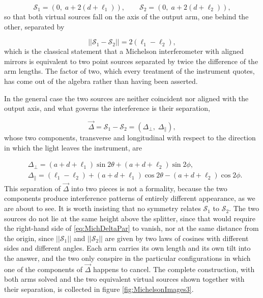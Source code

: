         \begin{equation}\label{eq:MichAligned}
            \mathcal{S}_1 = \left(0,\;a+2\left(d+\ell_1\right)\right), \qquad \mathcal{S}_2 = \left(0,\;a+2\left(d+\ell_2\right)\right),
        \end{equation}
        so that both virtual sources fall on the axis of the output arm, one behind the other, separated by

        \begin{equation*}
            \left|\left|\mathcal{S}_1-\mathcal{S}_2\right|\right| = 2\left(\ell_1-\ell_2\right),
        \end{equation*}
        which is the classical statement that a Michelson interferometer with aligned mirrors is equivalent to two point sources separated by twice the difference of the arm lengths. The factor of two, which every treatment of the instrument quotes, has come out of the algebra rather than having been asserted.

        In the general case the two sources are neither coincident nor aligned with the output axis, and what governs the interference is their separation,

        \begin{equation}\label{eq:MichDelta}
            \vec{\Delta} = \mathcal{S}_1 - \mathcal{S}_2 = \left(\Delta_\perp,\;\Delta_\parallel\right),
        \end{equation}
        whose two components, transverse and longitudinal with respect to the direction in which the light leaves the instrument, are

        \begin{align}
            & \Delta_\perp = \left(a+d+\ell_1\right)\sin 2\theta + \left(a+d+\ell_2\right)\sin 2\phi,\label{eq:MichDeltaPerp}\\
            & \Delta_\parallel = \left(\ell_1-\ell_2\right) + \left(a+d+\ell_1\right)\cos 2\theta - \left(a+d+\ell_2\right)\cos 2\phi.\label{eq:MichDeltaPar}
        \end{align}
        This separation of $\vec{\Delta}$ into two pieces is not a formality, because the two components produce interference patterns of entirely different appearance, as we are about to see. It is worth insisting that no symmetry relates $\mathcal{S}_1$ to $\mathcal{S}_2$. The two sources do not lie at the same height above the splitter, since that would require the right-hand side of \ref{eq:MichDeltaPar} to vanish, nor at the same distance from the origin, since $\left|\left|\mathcal{S}_1\right|\right|$ and $\left|\left|\mathcal{S}_2\right|\right|$ are given by two laws of cosines with different sides and different angles. Each arm carries its own length and its own tilt into the answer, and the two only conspire in the particular configurations in which one of the components of $\vec{\Delta}$ happens to cancel. The complete construction, with both arms solved and the two equivalent virtual sources shown together with their separation, is collected in figure \ref{fig:MichelsonImages3}.

